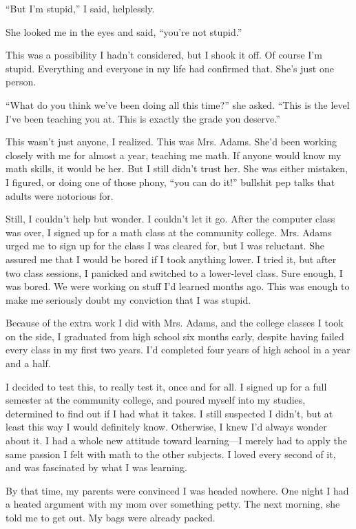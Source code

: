 ``But I'm stupid,'' I said, helplessly.

She looked me in the eyes and said, ``you're not stupid.''

This was a possibility I hadn't considered, but I shook it off. Of course I'm stupid. Everything and everyone in my life had confirmed that. She's just one person. 

``What do you think we've been doing all this time?'' she asked. ``This is the level I've been teaching you at. This is exactly the grade you deserve.''

This wasn't just anyone, I realized. This was Mrs. Adams. She'd been working closely with me for almost a year, teaching me math. If anyone would know my math skills, it would be her. But I still didn't trust her. She was either mistaken, I figured, or doing one of those phony, ``you can do it!'' bullshit pep talks that adults were notorious for.

Still, I couldn't help but wonder. I couldn't let it go. After the computer class was over, I signed up for a math class at the community college. Mrs. Adams urged me to sign up for the class I was cleared for, but I was reluctant. She assured me that I would be bored if I took anything lower. I tried it, but after two class sessions, I panicked and switched to a lower-level class. Sure enough, I was bored. We were working on stuff I'd learned months ago. This was enough to make me seriously doubt my conviction that I was stupid.

Because of the extra work I did with Mrs. Adams, and the college classes I took on the side, I graduated from high school six months early, despite having failed every class in my first two years. I'd completed four years of high school in a year and a half.

I decided to test this, to really test it, once and for all. I signed up for a full semester at the community college, and poured myself into my studies, determined to find out if I had what it takes. I still suspected I didn't, but at least this way I would definitely know. Otherwise, I knew I'd always wonder about it. I had a whole new attitude toward learning---I merely had to apply the same passion I felt with math to the other subjects. I loved every second of it, and was fascinated by what I was learning.

By that time, my parents were convinced I was headed nowhere. One night I had a heated argument with my mom over something petty. The next morning, she told me to get out. My bags were already packed.

